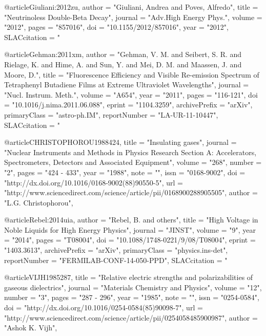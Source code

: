 {{{@article{Giuliani:2012zu,
      author         = "Giuliani, Andrea and Poves, Alfredo",
      title          = "{Neutrinoless Double-Beta Decay}",
      journal        = "Adv.High Energy Phys.",
      volume         = "2012",
      pages          = "857016",
      doi            = "10.1155/2012/857016",
      year           = "2012",
      SLACcitation   = "%
}


@article{Gehman:2011xm,
      author         = "Gehman, V. M. and Seibert, S. R. and Rielage, K. and
                        Hime, A. and Sun, Y. and Mei, D. M. and Maassen, J. and
                        Moore, D.",
      title          = "{Fluorescence Efficiency and Visible Re-emission Spectrum
                        of Tetraphenyl Butadiene Films at Extreme Ultraviolet
                        Wavelengths}",
      journal        = "Nucl. Instrum. Meth.",
      volume         = "A654",
      year           = "2011",
      pages          = "116-121",
      doi            = "10.1016/j.nima.2011.06.088",
      eprint         = "1104.3259",
      archivePrefix  = "arXiv",
      primaryClass   = "astro-ph.IM",
      reportNumber   = "LA-UR-11-10447",
      SLACcitation   = "%
}





@article{CHRISTOPHOROU1988424,
title = "Insulating gases",
journal = "Nuclear Instruments and Methods in Physics Research Section A: Accelerators, Spectrometers, Detectors and Associated Equipment",
volume = "268",
number = "2",
pages = "424 - 433",
year = "1988",
note = "",
issn = "0168-9002",
doi = "http://dx.doi.org/10.1016/0168-9002(88)90550-5",
url = "http://www.sciencedirect.com/science/article/pii/0168900288905505",
author = "L.G. Christophorou",
}

@article{Rebel:2014uia,
      author         = "Rebel, B. and others",
      title          = "{High Voltage in Noble Liquids for High Energy Physics}",
      journal        = "JINST",
      volume         = "9",
      year           = "2014",
      pages          = "T08004",
      doi            = "10.1088/1748-0221/9/08/T08004",
      eprint         = "1403.3613",
      archivePrefix  = "arXiv",
      primaryClass   = "physics.ins-det",
      reportNumber   = "FERMILAB-CONF-14-050-PPD",
      SLACcitation   = "%
}

@article{VIJH1985287,
title = "Relative electric strengths and polarizabilities of gaseous dielectrics",
journal = "Materials Chemistry and Physics",
volume = "12",
number = "3",
pages = "287 - 296",
year = "1985",
note = "",
issn = "0254-0584",
doi = "http://dx.doi.org/10.1016/0254-0584(85)90098-7",
url = "http://www.sciencedirect.com/science/article/pii/0254058485900987",
author = "Ashok K. Vijh",
}




}}}
